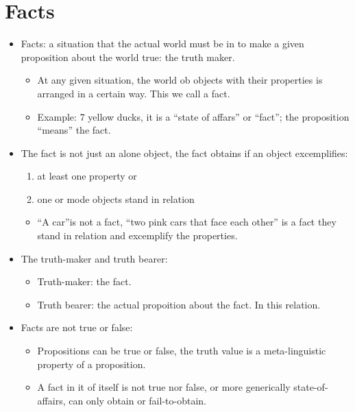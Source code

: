\section{Facts}
\begin{itemize}
    \item Facts: a situation that the actual world must be in to make a given proposition about the world true: the truth maker.
        \begin{itemize}
            \item At any given situation, the world ob objects with their properties is arranged in a certain way. This we call a fact.
            \item Example: 7 yellow ducks, it is a ``state of affars'' or ``fact''; the proposition ``means'' the fact.
        \end{itemize}
    \item The fact is not just an alone object, the fact obtains if an object excemplifies:
        \begin{enumerate}
            \item at least one property or 
            \item one or mode objects stand in relation 
        \end{enumerate}
        \begin{itemize}
            \item ``A car''is not a fact, ``two pink cars that face each other'' is a fact  they stand in relation and excemplify the properties.
        \end{itemize}
    
    \item The truth-maker and truth bearer: 
        \begin{itemize}
            \item Truth-maker: the fact.
            \item Truth bearer: the actual propoition about the fact. In this relation. 
        \end{itemize}
    
    \item Facts are not true or false: 
        \begin{itemize}
            \item Propositions can be true or false, the truth value is a meta-linguistic property of a proposition. 
            \item A fact in it of itself is not true nor false, or more generically state-of-affairs, can only obtain or fail-to-obtain.
        \end{itemize}
    

\end{itemize}
